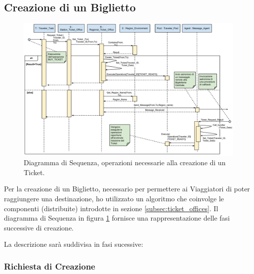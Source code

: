 \newpage
\subsection{Creazione di un Biglietto}

	\begin{figure}[htbp]
		\includegraphics[trim = 55mm 0mm 0mm 0mm,scale=0.43]{imgs/Buy_Ticket_Sequence_Diagram.pdf}
		\caption{\footnotesize{Diagramma di Sequenza, operazioni necessarie alla creazione di un Ticket.}}
		\label{fig:ticket_creation_diagram}
	\end{figure}

Per la creazione di un Biglietto, necessario per permettere ai Viaggiatori di poter raggiungere una destinazione, ho utilizzato un algoritmo che coinvolge le componenti (distribuite) introdotte in sezione \ref{subsec:ticket_offices}.
Il diagramma di Sequenza in figura \ref{fig:ticket_creation_diagram} fornisce una rappresentazione delle fasi successive di creazione.


La descrizione sarà suddivisa in fasi sucessive:

	\subsubsection {Richiesta di Creazione}\label{subsubsec:ticket_creation_request}
	
